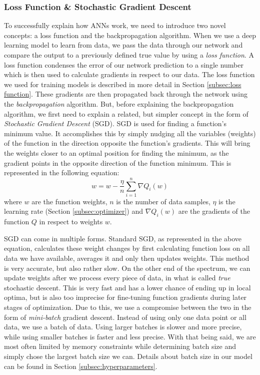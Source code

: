 \documentclass[times, utf8, diplomski, english]{fer_eng}
\begin{document}
\subsubsection{Loss Function \& Stochastic Gradient Descent}
\label{subsubsec: loss function and stochastic gradient descent}

To successfully explain how ANNs work, we need to introduce two novel concepts: a loss function and the backpropagation algorithm. When we use a deep learning model to learn from data, we pass the data through our network and compare the output to a previously defined true value by using a \textit{loss function}. A loss function condenses the error of our network prediction to a single number which is then used to calculate gradients in respect to our data. The loss function we used for training models is described in more detail in Section \ref{subsec:loss function}. These gradients are then propagated back through the network using the \textit{backpropagation} algorithm. But, before explaining the backpropagation algorithm, we first need to explain a related, but simpler concept in the form of \textit{Stochastic Gradient Descent} (SGD). SGD is used for finding a function's minimum value. It accomplishes this by simply nudging all the variables (weights) of the function in the direction opposite the function's gradients. This will bring the weights closer to an optimal position for finding the minimum, as the gradient points in the opposite direction of the function minimum. This is represented in the following equation:
\[ w = w - \frac{\eta}{n} \sum_{i=1}^n \nabla Q_i(w) \]
where $w$ are the function weights, $n$ is the number of data samples, $\eta$ is the learning rate (Section \ref{subsec:optimizer}) and $\nabla Q_i(w)$ are the gradients of the function $Q$ in respect to weights $w$.

SGD can come in multiple forms. Standard SGD, as represented in the above equation, calculates these weight changes by first calculating function loss on all data we have available, averages it and only then updates weights. This method is very accurate, but also rather slow. On the other end of the spectrum, we can update weights after we process every piece of data, in what is called \textit{true} stochastic descent. This is very fast and has a lower chance of ending up in local optima, but is also too imprecise for fine-tuning function gradients during later stages of optimization. Due to this, we use a compromise between the two in the form of \textit{mini-batch} gradient descent. Instead of using only one data point or all data, we use a batch of data. Using larger batches is slower and more precise, while using smaller batches is faster and less precise. With that being said, we are most often limited by memory constraints while determining batch size and simply chose the largest batch size we can. Details about batch size in our model can be found in Section \ref{subsec:hyperparameters}.
\end{document}

